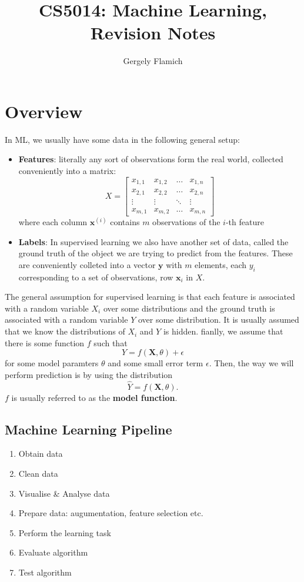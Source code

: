 \documentclass{article}
\title{CS5014: Machine Learning, Revision Notes}
\author{Gergely Flamich}
\renewcommand{\vec}[1]{\mathbf{#1}}
\renewcommand{\|}{\,\,|\,\,}
\begin{document}
\maketitle

\section{Overview}
In ML, we usually have some data in the following general setup:
\begin{itemize}
\item \textbf{Features}: literally any sort of observations form the real world,
  collected conveniently into a matrix:
  \[
    X =
    \begin{bmatrix}
      x_{1, 1} & x_{1, 2} & \hdots & x_{1, n} \\
      x_{2, 1} & x_{2, 2} & \hdots & x_{2, n} \\
      \vdots & \vdots & \ddots & \vdots \\
      x_{m, 1} & x_{m, 2} & \hdots & x_{m, n}
    \end{bmatrix}
  \]
  where each column $\vec{x}^{(i)}$ contains $m$ observations of the $i$-th feature
\item \textbf{Labels}: In supervised learning we also have another set of data,
  called the ground truth of the object we are trying to predict from the
  features. These are conveniently colleted into a vector $\vec{y}$ with $m$
  elements, each $y_i$ corresponding to a set of observations, row $\vec{x}_i$
  in $X$.
\end{itemize}
The general assumption for supervised learning is that each feature is associated with a random variable
$X_i$ over some distributions and the ground truth is associated with a random
variable $Y$ over some distribution. It is usually assumed that we know the
distributions of $X_i$ and $Y$ is hidden. fianlly, we assume that there is some
function $f$ such that
\[
  Y = f(\vec{X}, \theta) + \epsilon
\]
for some model paramters $\theta$ and some small error term $\epsilon$.
Then, the way we will perform prediction is by using the distribution
\[
  \hat{Y} = f(\vec{X}, \theta).
\]
$f$ is usually referred to as the \textbf{model function}.
\subsection{Machine Learning Pipeline}
\begin{enumerate}
\item Obtain data
\item Clean data
\item Visualise \& Analyse data
\item Prepare data: augumentation, feature selection etc.
\item Perform the learning task
\item Evaluate algorithm
\item Test algorithm
\end{enumerate}
\end{document}
